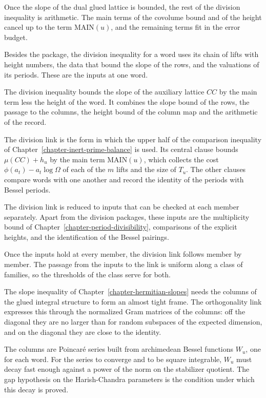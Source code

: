 Once the slope of the dual glued lattice is bounded, the rest of the division inequality is
arithmetic. The main terms of the covolume bound and of the height cancel up to the term
$\mathrm{MAIN}(u)$, and the remaining terms fit in the error budget.

Besides the package, the division inequality for a word uses its chain of lifts with height
numbers, the data that bound the slope of the rows, and the valuations of its periods. These are
the inputs at one word.

The division inequality bounds the slope of the auxiliary lattice $CC$ by the main term less the
height of the word. It combines the slope bound of the rows, the passage to the columns, the height
bound of the column map and the arithmetic of the record.

The division link is the form in which the upper half of the comparison inequality of
Chapter~\ref{chapter-inert-prime-balance} is used. Its central clause bounds
$\mu(CC)+h_u$ by the main term $\mathrm{MAIN}(u)$, which collects the cost $\phi(a_t)-a_t\log\Omega$
of each of the $m$ lifts and the size of $T_u$. The other clauses compare words with one another and
record the identity of the periods with Bessel periods.

The division link is reduced to inputs that can be checked at each member separately. Apart from the
division packages, these inputs are the multiplicity bound of
Chapter~\ref{chapter-period-divisibility}, comparisons of the explicit heights, and the
identification of the Bessel pairings.

Once the inputs hold at every member, the division link follows member by member. The passage
from the inputs to the link is uniform along a class of families, so the thresholds of the class
serve for both.

The slope inequality of Chapter~\ref{chapter-hermitian-slopes} needs the columns of the glued
integral structure to form an almost tight frame. The orthogonality link expresses this through the
normalized Gram matrices of the columns: off the diagonal they are no larger than for random
subspaces of the expected dimension, and on the diagonal they are close to the identity.

The columns are Poincaré series built from archimedean Bessel functions $W_u$, one for each word. For
the series to converge and to be square integrable, $W_u$ must decay fast enough against a power of
the norm on the stabilizer quotient. The gap hypothesis on the Harish-Chandra parameters is the
condition under which this decay is proved.

